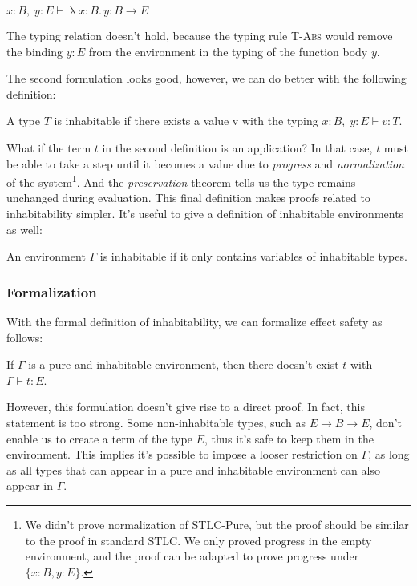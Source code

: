 \begin{center}
  $x:B, \; y:E \vdash \uplambda x{:}B {.}\, y : B \to E$
\end{center}

The typing relation doesn't hold, because the typing rule
\textsc{T-Abs} would remove the binding $y:E$ from the environment in
the typing of the function body $y$.

The second formulation looks good, however, we can do better with the
following definition:

\begin{definition}
  A type $T$ is inhabitable if there exists a value v with the typing
  $x:B, \; y:E \vdash v : T$.
\end{definition}

What if the term $t$ in the second definition is an application? In
that case, $t$ must be able to take a step until it becomes a value
due to \emph{progress} and \emph{normalization} of the
system\footnote{We didn't prove normalization of STLC-Pure, but the
  proof should be similar to the proof in standard STLC. We only
  proved progress in the empty environment, and the proof can be
  adapted to prove progress under $\{x:B, y:E\}$.}. And the
\emph{preservation} theorem tells us the type remains unchanged during
evaluation. This final definition makes proofs related to
inhabitability simpler. It's useful to give a definition of
inhabitable environments as well:

\begin{definition}
  An environment $\Gamma$ is inhabitable if it only contains variables
  of inhabitable types.
\end{definition}

\subsubsection{Formalization}

With the formal definition of inhabitability, we can formalize effect
safety as follows:

\begin{definition}
  If $\Gamma$ is a pure and inhabitable environment, then there
  doesn't exist $t$ with $\Gamma \vdash t : E$.
\end{definition}

However, this formulation doesn't give rise to a direct proof. In
fact, this statement is too strong. Some non-inhabitable types, such
as $E \to B \to E$, don't enable us to create a term of the type $E$,
thus it's safe to keep them in the environment. This implies it's
possible to impose a looser restriction on $\Gamma$, as long as all
types that can appear in a pure and inhabitable environment can also
appear in $\Gamma$.


